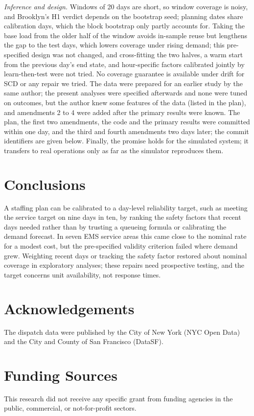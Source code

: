 \documentclass[11pt]{article}
\begin{document}
\emph{Inference and design.} Windows of 20 days are short, so window coverage is noisy, and Brooklyn's H1 verdict depends on the bootstrap seed; planning dates share calibration days, which the block bootstrap only partly accounts for. Taking the base load from the older half of the window avoids in-sample reuse but lengthens the gap to the test days, which lowers coverage under rising demand; this pre-specified design was not changed, and cross-fitting the two halves, a warm start from the previous day's end state, and hour-specific factors calibrated jointly by learn-then-test were not tried. No coverage guarantee is available under drift for SCD or any repair we tried. The data were prepared for an earlier study by the same author; the present analyses were specified afterwards and none were tuned on outcomes, but the author knew some features of the data (listed in the plan), and amendments 2 to 4 were added after the primary results were known. The plan, the first two amendments, the code and the primary results were committed within one day, and the third and fourth amendments two days later; the commit identifiers are given below. Finally, the promise holds for the simulated system; it transfers to real operations only as far as the simulator reproduces them.

\section{Conclusions}

A staffing plan can be calibrated to a day-level reliability target, such as meeting the service target on nine days in ten, by ranking the safety factors that recent days needed rather than by trusting a queueing formula or calibrating the demand forecast. In seven EMS service areas this came close to the nominal rate for a modest cost, but the pre-specified validity criterion failed where demand grew. Weighting recent days or tracking the safety factor restored about nominal coverage in exploratory analyses; these repairs need prospective testing, and the target concerns unit availability, not response times.

\section*{Acknowledgements}
The dispatch data were published by the City of New York (NYC Open Data) and the City and County of San Francisco (DataSF).

\section*{Funding Sources}
This research did not receive any specific grant from funding agencies in the public, commercial, or not-for-profit sectors.
\end{document}
